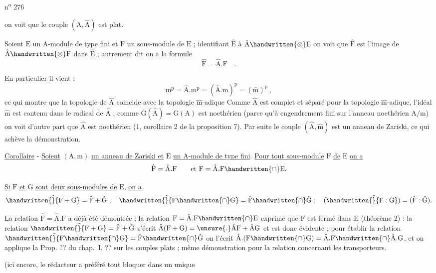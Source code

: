 
n\textsuperscript{o} 276

on voit que le couple $(\mathrm A,\hat{\mathrm A})$ est plat.

Soient $\mathrm E$ un $\mathrm A$-module de type fini et $\mathrm F$ un sous-module de $\mathrm E$ ; identifiant $\hat{\mathrm E}$ à $\hat{\mathrm A}\handwritten{\otimes}\mathrm E$ on voit que $\hat{\mathrm F}$ est l'image de $\hat{\mathrm A}\handwritten{\otimes}\mathrm F$ dans $\hat{\mathrm E}$ ; autrement dit on a la formule
\[
\hat{\mathrm F}=\hat{\mathrm A}.\mathrm F\quad .
\]

En particulier il vient :
\[
\mathrm m^{\mathrm p}=\hat{\mathrm A}.\mathrm m^{\mathrm p}=(\hat{\mathrm A}.\mathrm m)^{\mathrm p}=(\hat{\mathrm m})^{\mathrm p}\ , 
\]
ce qui montre que la topologie de $\hat{\mathrm A}$ coincide avec la topologie $\hat{\mathrm m}$-adique Comme $\hat{\mathrm A}$ est complet et séparé pour la topologie $\hat{\mathrm m}$-adique, l'idéal $\hat{\mathrm m}$ est contenu dans le radical de $\hat{\mathrm A}$ ; comme $\mathrm G(\hat{\mathrm A})=\mathrm G(\mathrm A)$ est noethérien (parce qu'à engendrement fini sur l'anneau noethérien $\mathrm A/\mathrm m$) on voit d'autre part que $\hat{\mathrm A}$ est noethérien (\handwritten{\S}1, corollaire 2 de la proposition 7). Par suite\unsure{,} le couple $(\hat{\mathrm A},\hat{\mathrm m})$ est un anneau de Zariski, ce qui achève la démonstration.

\uline{Corollaire} - \uline{Soient} $(\mathrm A,\mathrm m)$ \uline{un anneau de Zariski et} $\mathrm E$ \uline{un A-module de type fini}. \uline{Pour tout sous-module} $\mathrm F$ \uline{de} $\mathrm E$ \uline{on a}
\[
\hat{\mathrm F}=\hat{\mathrm A}.\mathrm F\qquad\text{et }\mathrm F=\hat{\mathrm A}.\mathrm F\handwritten{\cap}\mathrm E.
\]

\uline{Si} $\mathrm F$ \uline{et} $\mathrm G$ \uline{sont deux sous-modules de} $\mathrm E$, \uline{on a}
\[
\handwritten{\widehat}{\mathrm F+\mathrm G}=\hat{\mathrm F}+\hat{\mathrm G}\ ;\quad
\handwritten{\widehat}{\mathrm F\handwritten{\cap}\mathrm G}=\hat{\mathrm F}\handwritten{\cap}\hat{\mathrm G}\ ;\quad
(\handwritten{\widehat}{\mathrm F:\mathrm G})=(\hat{\mathrm F}:\hat{\mathrm G}).
\]

La relation $\hat{\mathrm F}=\hat{\mathrm A}.\mathrm F$ a déjà été démontrée ; la relation $\mathrm F=\hat{\mathrm A}.\mathrm F\handwritten{\cap}\mathrm E$ exprime que $\mathrm F$ est fermé dans $\mathrm E$ (théorème 2) : la relation $\handwritten{\widehat}{\mathrm F+\mathrm G}=\hat{\mathrm F}+\hat{\mathrm G}$ s'écrit $\hat{\mathrm A}(\mathrm F+\mathrm G)=\unsure{.}\hat{\mathrm A}\mathrm F+\hat{\mathrm A}\mathrm G$ et est donc évidente ; pour établir la relation $\handwritten{\widehat}{\mathrm F\handwritten{\cap}\mathrm G}=\hat{\mathrm F}\handwritten{\cap}\hat{\mathrm G}$ on l'écrit $\hat{\mathrm A}.(\mathrm F\handwritten{\cap}\mathrm G)=\hat{\mathrm A}.\mathrm F\handwritten{\cap}\hat{\mathrm A}.\mathrm G$, et on applique la Prop.\unsure{,} ?? du chap.~I, \handwritten{\S} ?? sur les couples plats ; même démonstration pour la relation concernant les transporteurs.

(ici encore, le rédacteur a préféré tout bloquer dans un unique

